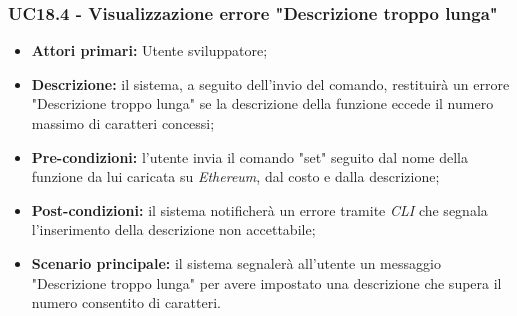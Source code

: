 \subsubsection{UC18.4 - Visualizzazione errore "Descrizione troppo lunga"}
\begin{itemize}
	\item \textbf{Attori primari:} Utente sviluppatore;
	\item \textbf{Descrizione:} il sistema, a seguito dell'invio del comando, restituirà un errore "Descrizione troppo lunga" se la descrizione della funzione eccede il numero massimo di caratteri concessi;
	\item \textbf{Pre-condizioni:}  l'utente invia il comando "set" seguito dal nome della funzione da lui caricata su \textit{Ethereum\glos}, dal costo e dalla descrizione;
	\item \textbf{Post-condizioni:} il sistema notificherà un errore tramite \textit{CLI\glo} che segnala l'inserimento della descrizione non accettabile;
	\item \textbf{Scenario principale:} il sistema segnalerà all'utente un messaggio "Descrizione troppo lunga" per avere impostato una descrizione che supera il numero consentito di caratteri.
\end{itemize}